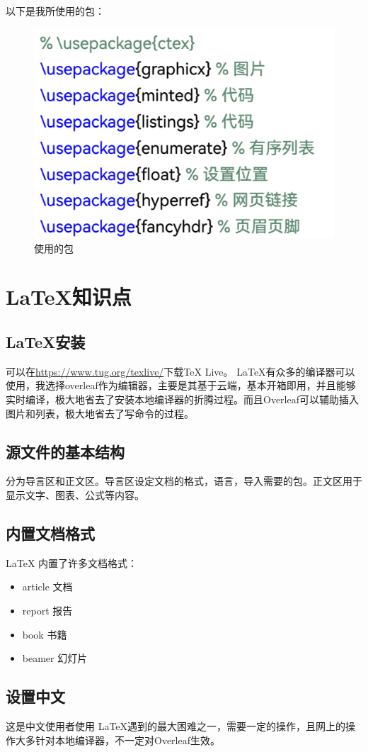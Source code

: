 \documentclass[fontset=ubuntu]{ctexart}
\begin{document}
以下是我所使用的包：
\begin{figure}[htb]
    \centering
    \includegraphics[width=0.5\linewidth]{Package.png}
    \caption{使用的包}
    \label{fig:Package}
\end{figure}

\section{ \LaTeX 知识点}

\subsection{ \LaTeX 安装}
可以在\url{https://www.tug.org/texlive/}下载TeX Live。 \LaTeX 有众多的编译器可以使用，我选择overleaf作为编辑器，主要是其基于云端，基本开箱即用，并且能够实时编译，极大地省去了安装本地编译器的折腾过程。而且Overleaf可以辅助插入图片和列表，极大地省去了写命令的过程。

\subsection{源文件的基本结构}
分为导言区和正文区。导言区设定文档的格式，语言，导入需要的包。正文区用于显示文字、图表、公式等内容。

\subsection{内置文档格式}
 \LaTeX{} 内置了许多文档格式：
 \begin{itemize}
     \item article 文档
     \item report 报告
     \item book 书籍
     \item beamer 幻灯片
 \end{itemize}

\subsection{设置中文}
这是中文使用者使用 \LaTeX 遇到的最大困难之一，需要一定的操作，且网上的操作大多针对本地编译器，不一定对Overleaf生效。
\end{document}

